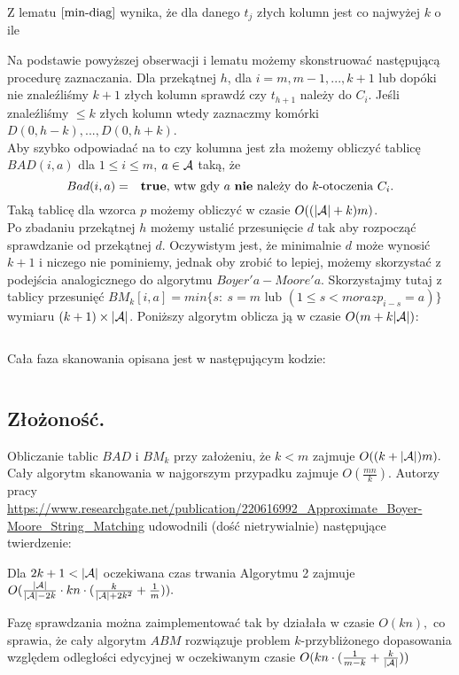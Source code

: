 \begin{remark-thm}
    Z lematu $\ref{min-diag}$ wynika, że dla danego $t_j$ złych kolumn jest co najwyżej $k$ o ile
\end{remark-thm}

Na podstawie powyższej obserwacji i lematu możemy skonstruować następującą procedurę zaznaczania. Dla przekątnej $h$, dla $i=m, m-1, ..., k+1$ lub dopóki nie znaleźliśmy $k+1$ złych kolumn sprawdź czy $t_{h+1}$ należy do $C_i$.
Jeśli znaleźliśmy $\leq k$ złych kolumn wtedy zaznaczmy komórki $D(0, h-k),...,D(0,h+k)$.\\
Aby szybko odpowiadać na to czy kolumna jest zła możemy obliczyć tablicę $BAD(i,a)$ dla $1 \leq i \leq m$, $a \in \mathcal{A}$ taką, że
\[
    Bad(i,a) = \text{ \textbf{ true}, wtw  gdy $a$ \textbf{nie} należy do $k$-otoczenia $C_i$.}
\]
Taką tablicę dla wzorca $p$ możemy obliczyć w czasie $O((|\mathcal{A}|+k)m)$.\\
Po zbadaniu przekątnej $h$ możemy ustalić przesunięcie $d$ tak aby rozpocząć sprawdzanie od przekątnej $d$. Oczywistym jest, że minimalnie $d$ może wynosić $k+1$ i niczego nie pominiemy, jednak oby zrobić to lepiej, możemy skorzystać z podejścia analogicznego do algorytmu $Boyer'a-Moore'a$. Skorzystajmy tutaj z tablicy przesunięć $BM_k[i,a] = min \{s:\ s=m \text{ lub } (1\leq s < m oraz p_{i-s} = a)\}$ wymiaru $(k+1) \times |\mathcal{A}|$. Poniższy algorytm oblicza ją w czasie $O(m+k|\mathcal{A}|)$:

\begin{code}
\inputminted{python}{bm_multidim.py}
\label{alg:exact-string-matching-morris-pratt}
\end{code}

Cała faza skanowania opisana jest w następującym kodzie:

\begin{code}
\inputminted{python}{scan_faze.py}
\label{alg:exact-string-matching-morris-pratt}
\end{code}

\subsection{Złożoność.}

Obliczanie tablic $BAD$ i $BM_k$ przy założeniu, że $k < m$ zajmuje $O((k+|\mathcal{A}|)m).$ Cały algorytm skanowania w najgorszym przypadku zajmuje $O(\frac{mn}{k}).$ Autorzy pracy \url{https://www.researchgate.net/publication/220616992_Approximate_Boyer-Moore_String_Matching} udowodnili (dość nietrywialnie) następujące twierdzenie:

\begin{theorem}{}{}
    Dla $2k+1 < |\mathcal{A}|$ oczekiwana czas trwania Algorytmu 2 zajmuje $O(\frac{|\mathcal{A}|}{|\mathcal{A}| - 2k} \cdot kn \cdot (\frac{k}{|\mathcal{A}| + 2k^2} + \frac{1}{m})).$
\end{theorem}

Fazę sprawdzania można zaimplementować tak by działała w czasie $O(kn),$ co sprawia, że cały algorytm $ABM$ rozwiązuje problem $k$-przybliżonego dopasowania względem odległości edycyjnej w oczekiwanym czasie $O(kn\cdot(\frac{1}{m-k} + \frac{k}{|\mathcal{A}|}))$
